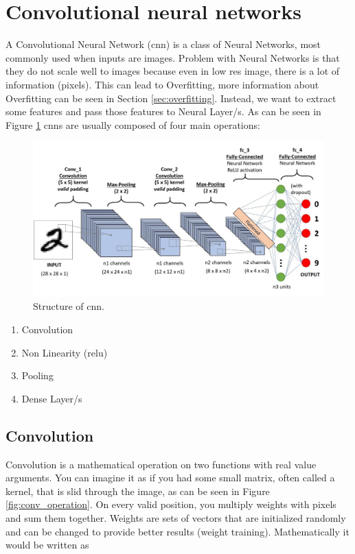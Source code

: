 \documentclass[thesis=B,english]{FITthesis}[2019/12/23]
\begin{document}
\section{Convolutional neural networks}
A Convolutional Neural Network (\gls{cnn}) is a class of Neural Networks, most commonly used when inputs are images. Problem with Neural Networks is that they do not scale well to images because even in low res image, there is a lot of information (pixels). This can lead to Overfitting, more information about Overfitting can be seen in Section \ref{sec:overfitting}. Instead, we want to extract some features and pass those features to Neural Layer/s. As can be seen in Figure \ref{fig:conv_network} \gls{cnn}s are usually composed of four main operations:

\begin{figure}
    \centering
    \includegraphics[width=.8\textwidth]{conv_network.jpeg}
    \caption[Convolutional Neural Network structure]{Structure of \gls{cnn}. \cite{saha_2018}}
    \label{fig:conv_network}
\end{figure}

\begin{enumerate}
    \item Convolution
    \item Non Linearity (\gls{relu})
    \item Pooling
    \item Dense Layer/s
\end{enumerate}

\subsection{Convolution}
    Convolution is a mathematical operation on two functions with real value arguments. You can imagine it as if you had some small matrix, often called a kernel, that is slid through the image, as can be seen in Figure \ref{fig:conv_operation}. On every valid position, you multiply weights with pixels and sum them together. Weights are sets of vectors that are initialized randomly and can be changed to provide better results (weight training). Mathematically it would be written as
    
\end{document}
